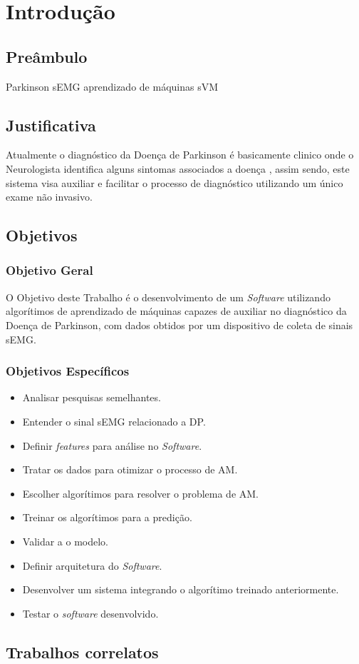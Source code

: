 \chapter*[Introdução]{Introdução}
\section{Preâmbulo}
Parkinson
sEMG
aprendizado de máquinas
sVM
\section{Justificativa}
Atualmente o diagnóstico da Doença de Parkinson é basicamente clinico onde o Neurologista identifica alguns sintomas associados a doença \cite{gago2014manual}, assim sendo, este sistema visa auxiliar e facilitar o processo de diagnóstico utilizando um único exame não invasivo.

\section{Objetivos}
\subsection{Objetivo Geral}
O Objetivo deste Trabalho é o desenvolvimento de um \textit{Software} utilizando algorítimos de aprendizado de máquinas capazes de auxiliar no diagnóstico da Doença de Parkinson, com dados obtidos por um dispositivo de coleta de sinais sEMG.

\subsection{Objetivos Específicos}
\begin{itemize}
    \item Analisar pesquisas semelhantes.
    \item Entender o sinal sEMG relacionado a DP.
    \item Definir \textit{features} para análise no \textit{Software}.
    \item Tratar os dados para otimizar o processo de AM.
    \item Escolher algorítimos para resolver o problema de AM.
    \item Treinar os algorítimos para a predição.
    \item Validar a o modelo.
    \item Definir arquitetura do \textit{Software}.
    \item Desenvolver um sistema integrando o algorítimo treinado anteriormente.
    \item Testar o \textit{software} desenvolvido.
\end{itemize}
\section{Trabalhos correlatos}